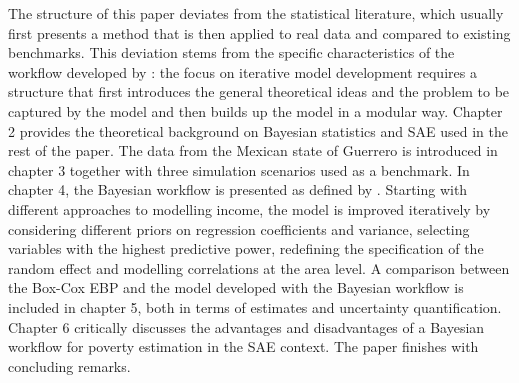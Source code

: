 The structure of this paper deviates from the statistical literature, which usually first presents a method that is then applied to real data and compared to existing benchmarks.
This deviation stems from the specific characteristics of the workflow developed by \cite{gelman_bayesian_2020}:
the focus on iterative model development requires a structure that first introduces the general theoretical ideas and the problem to be captured by the model and then builds up the model in a modular way.
Chapter 2 provides the theoretical background on Bayesian statistics and SAE used in the rest of the paper.
The data from the Mexican state of Guerrero is introduced in chapter 3 together with three simulation scenarios used as a benchmark.
In chapter 4, the Bayesian workflow is presented as defined by \cite{gelman_bayesian_2020}.
Starting with different approaches to modelling income, the model is improved iteratively by considering different priors on regression coefficients and variance, selecting variables with the highest predictive power, redefining the specification of the random effect and modelling correlations at the area level.
A comparison between the Box-Cox EBP \citep{rojas_perilla_data_2020} and the model developed with the Bayesian workflow is included in chapter 5, both in terms of estimates and uncertainty quantification.
Chapter 6 critically discusses the advantages and disadvantages of a Bayesian workflow for poverty estimation in the SAE context.
The paper finishes with concluding remarks.


